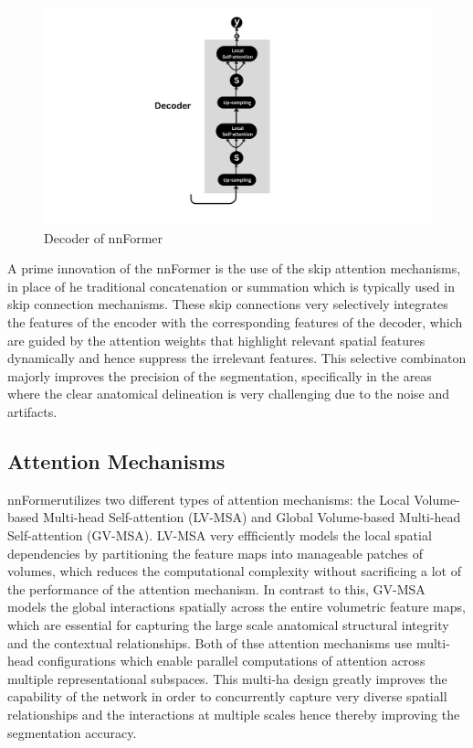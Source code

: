 \begin{figure}[htb!]  %
    \centering
	\centering
	\includegraphics[width=1\textwidth]{images/Decoder.png}
	\caption{\centering Decoder of nnFormer}
	\label{Fig:decoder}
\end{figure}

A prime innovation of the nnFormer is the use of the skip attention mechanisms, in place of he traditional concatenation or summation which is typically used in skip connection mechanisms. These skip connections very selectively integrates the features of the encoder with the corresponding features of the decoder, which are guided by the attention weights that highlight relevant spatial features dynamically and hence suppress the irrelevant features. This selective combinaton majorly improves the precision of the segmentation, specifically in the areas where the clear anatomical delineation is very challenging due to the noise and artifacts.

\subsection{Attention Mechanisms}
nnFormerutilizes two different types of attention mechanisms: the Local Volume-based Multi-head Self-attention (LV-MSA) and Global Volume-based Multi-head Self-attention (GV-MSA). LV-MSA very effficiently models the local spatial dependencies by partitioning the feature maps into manageable patches of volumes, which reduces the computational complexity without sacrificing a lot of the performance of the attention mechanism. In contrast to this, GV-MSA models the global interactions spatially across the entire volumetric feature maps, which are essential for capturing the large scale anatomical structural integrity and the contextual relationships. Both of thse attention mechanisms use multi-head configurations which enable parallel computations of attention across multiple representational subspaces. This multi-ha design greatly improves the capability of the network in order to concurrently capture very diverse spatiall relationships and the interactions at multiple scales hence thereby improving the segmentation accuracy.

